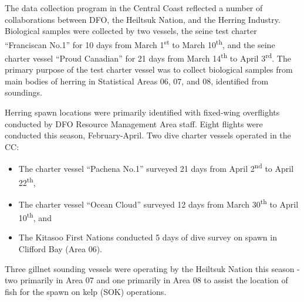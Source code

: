 The data collection program in the Central Coast reflected a number of collaborations between DFO, the Heiltsuk Nation, and the Herring Industry.
Biological samples were collected by two vessels, the seine test charter ``Franciscan No.1'' for 10 days from March 1\textsuperscript{st} to March 10\textsuperscript{th}, and the seine charter vessel ``Proud Canadian'' for 21 days from March 14\textsuperscript{th} to April 3\textsuperscript{rd}.
The primary purpose of the test charter vessel was to collect biological samples from main bodies of herring in Statistical Areas 06, 07, and 08, identified from soundings.

Herring spawn locations were primarily identified with fixed-wing overflights conducted by DFO Resource Management Area staff.
Eight flights were conducted this season, February-April.
Two dive charter vessels operated in the CC:
\begin{itemize}
\item The charter vessel ``Pachena No.1'' surveyed 21 days from April 2\textsuperscript{nd} to April 22\textsuperscript{th}, 
\item The charter vessel ``Ocean Cloud'' surveyed 12 days from March 30\textsuperscript{th} to April 10\textsuperscript{th}, and 
\item The Kitasoo First Nations conducted 5 days of dive survey on spawn in Clifford Bay (Area 06).
\end{itemize}
Three gillnet sounding vessels were operating by the Heiltsuk Nation this season - two primarily in Area 07 and one primarily in Area 08 to assist the location of fish for the spawn on kelp (SOK) operations.